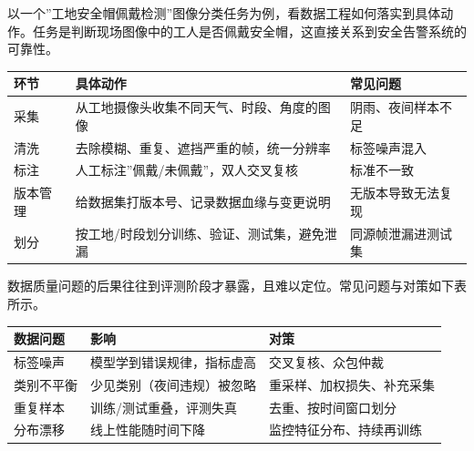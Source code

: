 \documentclass[
]{ctexbook}
\newcounter{none}
\begin{document}
以一个''工地安全帽佩戴检测''图像分类任务为例，看数据工程如何落实到具体动作。任务是判断现场图像中的工人是否佩戴安全帽，这直接关系到安全告警系统的可靠性。

{\def\LTcaptype{none} %
\begin{longtable}[]{@{}
  >{\raggedright\arraybackslash}p{}
  >{\raggedright\arraybackslash}p{}
  >{\raggedright\arraybackslash}p{}@{}}
\toprule\noalign{}
\begin{minipage}[b]{\linewidth}\raggedright
环节
\end{minipage} & \begin{minipage}[b]{\linewidth}\raggedright
具体动作
\end{minipage} & \begin{minipage}[b]{\linewidth}\raggedright
常见问题
\end{minipage} \\
\midrule\noalign{}
\endhead
\bottomrule\noalign{}
\endlastfoot
采集 & 从工地摄像头收集不同天气、时段、角度的图像 &
阴雨、夜间样本不足 \\
清洗 & 去除模糊、重复、遮挡严重的帧，统一分辨率 & 标签噪声混入 \\
标注 & 人工标注''佩戴/未佩戴''，双人交叉复核 & 标准不一致 \\
版本管理 & 给数据集打版本号、记录数据血缘与变更说明 &
无版本导致无法复现 \\
划分 & 按工地/时段划分训练、验证、测试集，避免泄漏 &
同源帧泄漏进测试集 \\
\end{longtable}
}

数据质量问题的后果往往到评测阶段才暴露，且难以定位。常见问题与对策如下表所示。

{\def\LTcaptype{none} %
\begin{longtable}[]{@{}lll@{}}
\toprule\noalign{}
数据问题 & 影响 & 对策 \\
\midrule\noalign{}
\endhead
\bottomrule\noalign{}
\endlastfoot
标签噪声 & 模型学到错误规律，指标虚高 & 交叉复核、众包仲裁 \\
类别不平衡 & 少见类别（夜间违规）被忽略 & 重采样、加权损失、补充采集 \\
重复样本 & 训练/测试重叠，评测失真 & 去重、按时间窗口划分 \\
分布漂移 & 线上性能随时间下降 & 监控特征分布、持续再训练 \\
\end{longtable}
}
\end{document}
